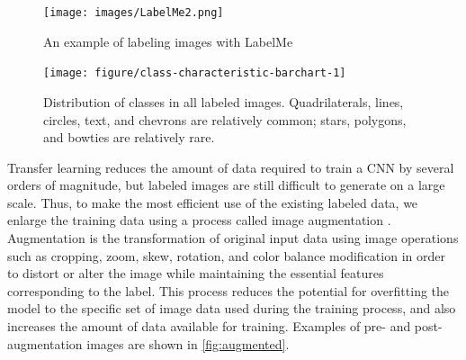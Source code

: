 \documentclass{article}\usepackage[]{graphicx}\usepackage[table]{xcolor}
\newenvironment{knitrout}{}{} %
\begin{document}
\begin{figure}[hbt]
\centering
\texttt{[image: images/LabelMe2.png]}
\caption{An example of labeling images with LabelMe}
\end{figure}

\begin{knitrout}
\color{fgcolor}\begin{figure}

{\centering \texttt{[image: figure/class-characteristic-barchart-1]}

}

\caption[Distribution of classes in all labeled images.]{Distribution of classes in all labeled images. Quadrilaterals, lines, circles, text, and chevrons are relatively common; stars, polygons, and bowties are relatively rare.}\label{fig:class-characteristic-barchart}
\end{figure}


\end{knitrout}

Transfer learning reduces the amount of data required to train a CNN by several orders of magnitude, but labeled images are still difficult to generate on a large scale. Thus, to make the most efficient use of the existing labeled data, we enlarge the training data using a process called image augmentation \citep{krizhevskyImageNetClassificationDeep2012}. Augmentation is the transformation of original input data using image operations such as cropping, zoom, skew, rotation, and color balance modification in order to distort or alter the image while maintaining the essential features corresponding to the label. This process reduces the potential for overfitting the model to the specific set of image data used during the training process, and also increases the amount of data available for training. Examples of pre- and post-augmentation images are shown in \autoref{fig:augmented}.
\end{document}
